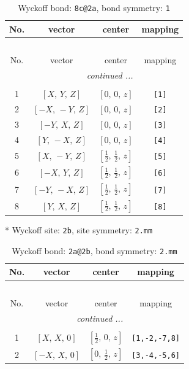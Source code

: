 \documentclass[fleqn,8pt]{jsarticle}
\begin{document}
\renewcommand{\arraystretch}{1.2}
\begin{longtable}{cccc}
\caption{Wyckoff bond: {\tt 8c@2a}, bond symmetry: {\tt 1}}
 \\
 \hline \hline
No. & vector & center & mapping \\ \hline \endfirsthead

\multicolumn{3}{l}{\tablename\ \thetable{}} \\
 \hline \hline
No. & vector & center & mapping \\ \hline \endhead

 \hline \hline
\multicolumn{3}{r}{\footnotesize\it continued ...} \\ \endfoot

 \hline \hline
\multicolumn{3}{r}{} \\ \endlastfoot

1 & $\left[ X,\, Y,\, Z \right]$ & $\left[ 0,\, 0,\, z \right]$ & {\tt [1]} \\ \hline
2 & $\left[ - X,\, - Y,\, Z \right]$ & $\left[ 0,\, 0,\, z \right]$ & {\tt [2]} \\ \hline
3 & $\left[ - Y,\, X,\, Z \right]$ & $\left[ 0,\, 0,\, z \right]$ & {\tt [3]} \\ \hline
4 & $\left[ Y,\, - X,\, Z \right]$ & $\left[ 0,\, 0,\, z \right]$ & {\tt [4]} \\ \hline
5 & $\left[ X,\, - Y,\, Z \right]$ & $\left[ \frac{1}{2},\, \frac{1}{2},\, z \right]$ & {\tt [5]} \\ \hline
6 & $\left[ - X,\, Y,\, Z \right]$ & $\left[ \frac{1}{2},\, \frac{1}{2},\, z \right]$ & {\tt [6]} \\ \hline
7 & $\left[ - Y,\, - X,\, Z \right]$ & $\left[ \frac{1}{2},\, \frac{1}{2},\, z \right]$ & {\tt [7]} \\ \hline
8 & $\left[ Y,\, X,\, Z \right]$ & $\left[ \frac{1}{2},\, \frac{1}{2},\, z \right]$ & {\tt [8]} \\
\end{longtable}
* Wyckoff site: {\tt 2b}, site symmetry: {\tt 2.mm}
\renewcommand{\arraystretch}{1.2}
\begin{longtable}{cccc}
\caption{Wyckoff bond: {\tt 2a@2b}, bond symmetry: {\tt 2.mm}}
 \\
 \hline \hline
No. & vector & center & mapping \\ \hline \endfirsthead

\multicolumn{3}{l}{\tablename\ \thetable{}} \\
 \hline \hline
No. & vector & center & mapping \\ \hline \endhead

 \hline \hline
\multicolumn{3}{r}{\footnotesize\it continued ...} \\ \endfoot

 \hline \hline
\multicolumn{3}{r}{} \\ \endlastfoot

1 & $\left[ X,\, X,\, 0 \right]$ & $\left[ \frac{1}{2},\, 0,\, z \right]$ & {\tt [1,-2,-7,8]} \\ \hline
2 & $\left[ - X,\, X,\, 0 \right]$ & $\left[ 0,\, \frac{1}{2},\, z \right]$ & {\tt [3,-4,-5,6]} \\
\end{longtable}
\end{document}
